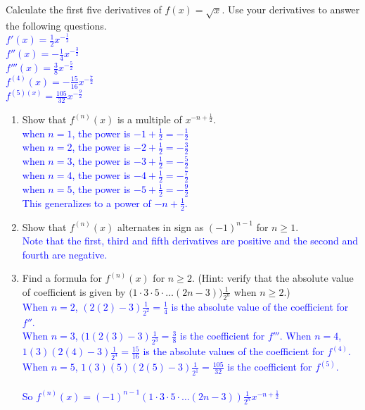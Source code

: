 \documentclass{ximera}
\begin{document}
\begin{exercise}
    Calculate the first five derivatives of $f(x)=\sqrt{x}$.  Use your derivatives to answer the following questions.\\
    \textcolor{blue}{$f'(x)=\frac{1}{2}x^{-\frac12}$\\
    $f''(x)=-\frac{1}{4}x^{-\frac{3}{2}}$\\
    $f'''(x)=\frac38x^{-\frac{5}{2}}$\\
    $f^{(4)}(x)=-\frac{15}{16}x^{-\frac{7}{2}}$\\
    $f^{(5)(x)}=\frac{105}{32}x^{-\frac{9}{2}}$}
        \begin{enumerate}
            \item Show that $f^{(n)}(x)$ is a multiple of $x^{-n+\frac12}$.\\
            \textcolor{blue}{ when $n=1$, the power is $-1+\frac12=-\frac12$\\
             when $n=2$, the power is $-2+\frac12=-\frac32$\\
            when $n=3$, the power is $-3+\frac12=-\frac52$\\
            when $n=4$, the power is $-4+\frac12=-\frac72$\\
            when $n=5$, the power is $-5+\frac12=-\frac92$\\
            This generalizes to a power of $-n+\frac12$.}
            \item Show that $f^{(n)}(x)$ alternates in sign as $(-1)^{n-1}$ for $n\geq 1$.\\
            \textcolor{blue}{ Note that the first, third and fifth derivatives are positive and the second and fourth are negative.}
            \item Find a formula for $f^{(n)}(x)$ for $n\geq 2$.  (Hint: verify that the absolute value of coefficient is given by $\big(1\cdot3\cdot5\cdot \dots(2n-3)\big)\frac{1}{2^n}$ when $n\geq 2$.)\\
            \textcolor{blue}{ 
            When $n=2$, $(2(2)-3)\frac{1}{2^2}=\frac{1}{4}$ is the absolute value of the coefficient for $f''$.\\
            When $n=3$, $(1(2(3)-3)\frac{1}{2^3}=\frac{3}{8}$ is the coefficient for $f'''$.
            When $n=4$, $1(3)(2(4)-3)\frac{1}{2^4}=\frac{15}{16}$ is the absolute values of the coefficient for $f^{(4)}$.\\
            When $n=5$, $1(3)(5)(2(5)-3)\frac{1}{2^1}=\frac{105}{32}$ is the coefficient for $f^{(5)}$.\\\\
            So $f^{(n)}(x)=(-1)^{n-1}(1\cdot3\cdot5\cdot\dots(2n-3))\frac{1}{2^n}x^{-n+\frac12}$}
        \end{enumerate}
\end{exercise}
\end{document}
